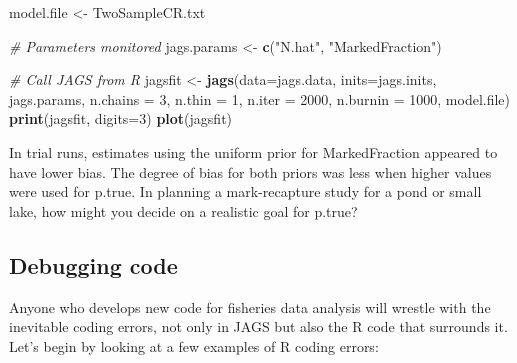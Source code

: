 \documentclass[
]{krantz}
\makeatletter
\newenvironment{Shaded}{\begin{snugshade}}{\end{snugshade}}
\newcommand{\AttributeTok}[1]{\textcolor[rgb]{0.27,0.27,0.27}{#1}}
\newcommand{\CommentTok}[1]{\textcolor[rgb]{0.37,0.37,0.37}{\textit{#1}}}
\newcommand{\DecValTok}[1]{\textcolor[rgb]{0.06,0.06,0.06}{#1}}
\newcommand{\FunctionTok}[1]{\textcolor[rgb]{0.27,0.27,0.27}{\textbf{#1}}}
\newcommand{\NormalTok}[1]{#1}
\newcommand{\OtherTok}[1]{\textcolor[rgb]{0.37,0.37,0.37}{#1}}
\newcommand{\StringTok}[1]{\textcolor[rgb]{0.5,0.5,0.5}{#1}}
\newenvironment{kframe}{%
\medskip{}
\setlength{\fboxsep}{.8em}
 \def\at@end@of@kframe{}%
 \ifinner\ifhmode%
  \def\at@end@of@kframe{\end{minipage}}%
  \begin{minipage}{\columnwidth}%
 \fi\fi%
 \def\FrameCommand##1{\hskip\@totalleftmargin \hskip-\fboxsep
 \colorbox{shadecolor}{##1}\hskip-\fboxsep
     \hskip-\linewidth \hskip-\@totalleftmargin \hskip\columnwidth}%
 \MakeFramed {\advance\hsize-\width
   \@totalleftmargin\z@ \linewidth\hsize
   \@setminipage}}%
 {\par\unskip\endMakeFramed%
 \at@end@of@kframe}
\renewenvironment{Shaded}{\begin{kframe}}{\end{kframe}}
\makeatother
\begin{document}
\begin{Shaded}
\begin{Highlighting}[]
\NormalTok{model.file }\OtherTok{\textless{}{-}} \StringTok{\textquotesingle{}TwoSampleCR.txt\textquotesingle{}}

\CommentTok{\# Parameters monitored}
\NormalTok{jags.params }\OtherTok{\textless{}{-}} \FunctionTok{c}\NormalTok{(}\StringTok{"N.hat"}\NormalTok{, }\StringTok{"MarkedFraction"}\NormalTok{)}

\CommentTok{\# Call JAGS from R}
\NormalTok{jagsfit }\OtherTok{\textless{}{-}} \FunctionTok{jags}\NormalTok{(}\AttributeTok{data=}\NormalTok{jags.data, }\AttributeTok{inits=}\NormalTok{jags.inits, jags.params,}
                \AttributeTok{n.chains =} \DecValTok{3}\NormalTok{, }\AttributeTok{n.thin =} \DecValTok{1}\NormalTok{, }\AttributeTok{n.iter =} \DecValTok{2000}\NormalTok{, }\AttributeTok{n.burnin =} \DecValTok{1000}\NormalTok{,}
\NormalTok{                model.file)}
\FunctionTok{print}\NormalTok{(jagsfit, }\AttributeTok{digits=}\DecValTok{3}\NormalTok{)}
\FunctionTok{plot}\NormalTok{(jagsfit)}
\end{Highlighting}
\end{Shaded}

In trial runs, estimates using the uniform prior for MarkedFraction appeared to have lower bias. The degree of bias for both priors was less when higher values were used for p.true. In planning a mark-recapture study for a pond or small lake, how might you decide on a realistic goal for p.true?

\hypertarget{Debug}{%
\subsection{Debugging code}\label{Debug}}

Anyone who develops new code for fisheries data analysis will wrestle with the inevitable coding errors, not only in JAGS but also the R code that surrounds it. Let's begin by looking at a few examples of R coding errors:
\end{document}

